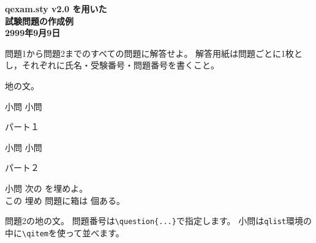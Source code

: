 \documentclass[dvipdfmx,11pt,a4j]{jarticle}
\begin{document}


\begin{center}
	\textbf{\Large  qexam.sty v2.0 を用いた\\
	\bigskip
	試験問題の作成例}\\
	\bigskip
	\textbf{\large 2999年9月9日}
\end{center}

問題1から問題2までのすべての問題に解答せよ。
解答用紙は問題ごとに1枚とし，それぞれに氏名・受験番号・問題番号を書くこと。

地の文。
\begin{qlist}
	\qitem 小問
	\qitem 小問
\end{qlist}

\begin{qparts}
	\qpart パート１
		\begin{qlist}
			\qitem 小問
			\qitem 小問
		\end{qlist}
	\qpart パート２
		\begin{qlist}
			\qitem 小問
			\qitem 次の \qbox{(a) -- (b)}を埋めよ。\\
				この \qbox{}埋め 問題に箱は \qbox{}個ある。
		\end{qlist}
\end{qparts}



\clearpage
{}
問題2の地の文。
問題番号は{\tt \verb"\question{...}"}で指定します。
小問は{\tt qlist}環境の中に{\tt \verb"\qitem"}を使って並べます。
\end{document}
